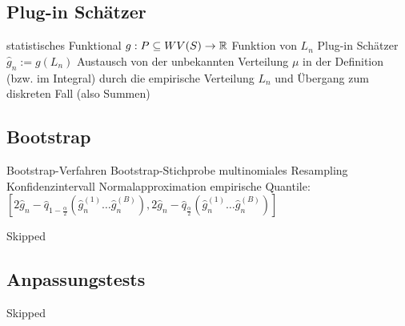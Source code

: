 \subsection{Plug-in Schätzer}

\begin{outline}
    \1 statistisches Funktional $g:P\subseteq WV(S)\rightarrow \mathbb{R}$ 
        \2 Funktion von $L_n$
    \1 Plug-in Schätzer $\hat{g}_n := g(L_n)$ 
        \2 Austausch von der unbekannten Verteilung $\mu$ in der Definition (bzw. im Integral) durch die empirische Verteilung $L_n$ und Übergang zum diskreten Fall (also Summen)
\end{outline}

\subsection{Bootstrap}

\begin{outline}
    \1 Bootstrap-Verfahren
    \1 Bootstrap-Stichprobe
        \2 multinomiales Resampling
    \1 Konfidenzintervall
        \2 Normalapproximation
        \2 empirische Quantile: $[2\hat{g}_n-\hat{q}_{1-\frac{\alpha}{2}}(\hat{g}_n^{(1)}\ldots\hat{g}_n^{(B)}), 2\hat{g}_n-\hat{q}_{\frac{\alpha}{2}}(\hat{g}_n^{(1)}\ldots\hat{g}_n^{(B)})]$
\end{outline}

Skipped 

\subsection{Anpassungstests}

Skipped


